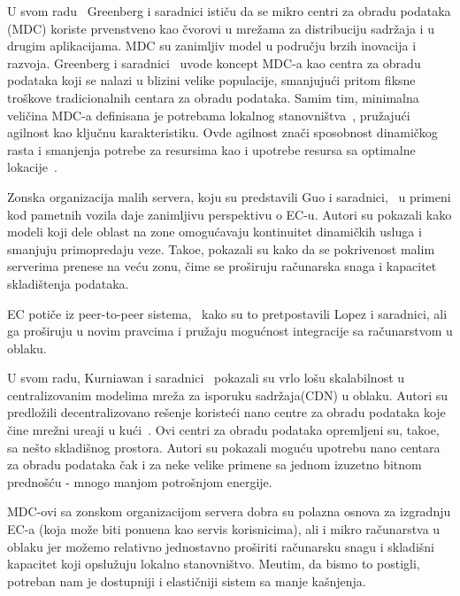U svom radu~\cite{GreenbergHMP09} Greenberg i saradnici isti\v cu da se mikro centri za obradu podataka (MDC) koriste prvenstveno kao \v cvorovi u mre\v zama za distribuciju sadr\v zaja i u drugim  aplikacijama. MDC su zanimljiv model u podru\v cju brzih inovacija i razvoja. Greenberg i saradnici~\cite{GreenbergHMP09} uvode koncept MDC-a kao centra za obradu podataka koji se nalazi u blizini velike populacije, smanjuju\'ci pritom fiksne tro\v skove tradicionalnih centara za obradu podataka. Samim tim, minimalna veli\v cina MDC-a definisana je potrebama lokalnog stanovni\v stva~\cite{GreenbergHMP09, AbbasZTS18}, pru\v zaju\'ci agilnost kao klju\v cnu karakteristiku. Ovde agilnost zna\v ci sposobnost dinami\v ckog rasta i smanjenja potrebe za resursima kao i upotrebe resursa sa optimalne lokacije~\cite{GreenbergHMP09}. 

Zonska organizacija malih servera, koju su predstavili Guo i saradnici,~\cite{GuoRG20} u primeni kod pametnih vozila daje zanimljivu perspektivu o EC-u. Autori su pokazali kako modeli koji dele oblast na zone omogu\'cavaju kontinuitet dinami\v ckih usluga i smanjuju primopredaju veze. Tako\dj e, pokazali su kako da se pokrivenost malim serverima prenese na ve\'cu zonu, \v cime se pro\v siruju ra\v cunarska snaga i kapacitet skladi\v stenja podataka.

EC poti\v ce iz peer-to-peer sistema,~\cite{LopezMEDHIBFR15} kako su to pretpostavili Lopez i saradnici, ali ga pro\v siruju u novim pravcima i pru\v zaju mogu\'cnost integracije sa ra\v cunarstvom u oblaku.

U svom radu, Kurniawan i saradnici~\cite{inbookKurniawan} pokazali su vrlo lo\v su skalabilnost u centralizovanim modelima mre\v za za isporuku sadr\v zaja(CDN) u oblaku. Autori su predlo\v zili decentralizovano re\v senje koriste\'ci nano centre za obradu podataka koje \v cine mre\v zni ure\dj aji u ku\'ci~\cite{inbookKurniawan}. Ovi centri za obradu podataka opremljeni su, tako\dj e, sa ne\v sto skladi\v snog prostora. Autori su pokazali mogu\'cu upotrebu nano centara za obradu podataka \v cak i za neke velike primene sa jednom izuzetno bitnom predno\v s\'cu - mnogo manjom potro\v snjom energije.

MDC-ovi sa zonskom organizacijom servera dobra su polazna osnova za izgradnju EC-a (koja mo\v ze biti ponu\dj ena kao servis korisnicima), ali i mikro ra\v cunarstva u oblaku jer mo\v zemo relativno jednostavno pro\v siriti ra\v cunarsku snagu i skladi\v sni kapacitet koji opslu\v zuju lokalno stanovni\v stvo. Me\dj utim, da bismo to postigli, potreban nam je dostupniji i elasti\v cniji sistem sa manje ka\v snjenja. 


